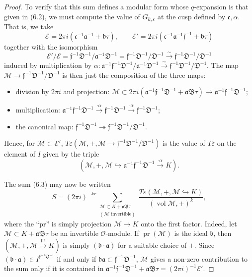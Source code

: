 \documentclass[12pt,a4paper]{article}
\theoremstyle{plain}
\theoremstyle{definition}
\theoremstyle{remark}
\DeclareMathOperator{\vol}{vol}
\DeclareMathOperator{\pr}{pr}
\begin{document}
\begin{proof}
To verify that this sum defines a modular form whose $q$-expansion is that given in (6.2), we must compute the value of $G_{k,\varepsilon}$ at the cusp defined by $\mathfrak{c}, \alpha$. That is, we take
\[
\mathcal{E} = 2\pi i(\mathfrak{c}^{-1}\mathfrak{a}^{-1} + \mathfrak{b}\tau), \qquad \mathcal{E}' = 2\pi i(\mathfrak{c}^{-1}\mathfrak{a}^{-1}\mathfrak{f}^{-1} + \mathfrak{b}\tau)
\]
together with the isomorphism
\[
\mathcal{E}'/\mathcal{E} = \mathfrak{f}^{-1}\mathfrak{D}^{-1}/\mathfrak{a}^{-1} \mathfrak{D}^{-1} = \mathfrak{f}^{-1}\mathfrak{D}^{-1}/\mathfrak{D}^{-1} \xrightarrow{\sim} \mathfrak{f}^{-1}\mathfrak{D}^{-1}/\mathfrak{D}^{-1}
\]
induced by multiplication by $\alpha: \mathfrak{a}^{-1}\mathfrak{f}^{-1}\mathfrak{D}^{-1}/\mathfrak{a}^{-1}\mathfrak{D}^{-1} \xrightarrow{\sim} \mathfrak{f}^{-1}\mathfrak{D}^{-1}/\mathfrak{D}^{-1}$. The map $\mathscr{M} \to \mathfrak{f}^{-1}\mathfrak{D}^{-1}/\mathfrak{D}^{-1}$ is then just the composition of the three maps:
\begin{itemize}
\item division by $2\pi i$ and projection: $\mathscr{M} \subset 2\pi i(\mathfrak{a}^{-1}\mathfrak{f}^{-1}\mathfrak{D}^{-1} + \mathfrak{a}\mathfrak{B}\tau) \to \mathfrak{a}^{-1}\mathfrak{f}^{-1}\mathfrak{D}^{-1}$;
\item multiplication: $\mathfrak{a}^{-1}\mathfrak{f}^{-1}\mathfrak{D}^{-1} \xrightarrow{\cdot \alpha} \mathfrak{f}^{-1}\mathfrak{D}^{-1} \xrightarrow{\cdot \alpha} \mathfrak{f}^{-1}\mathfrak{D}^{-1}$;
\item the canonical map: $\mathfrak{f}^{-1}\mathfrak{D}^{-1} \twoheadrightarrow \mathfrak{f}^{-1}\mathfrak{D}^{-1}/\mathfrak{D}^{-1}$.
\end{itemize}
Hence, for $\mathscr{M} \subset \mathcal{E}'$, $T\varepsilon(\mathscr{M}, +, \mathscr{M} \to \mathfrak{f}^{-1}\mathfrak{D}^{-1}/\mathfrak{D}^{-1})$ is the value of $T\varepsilon$ on the element of $I$ given by the triple
\[
(\mathscr{M}, +, \mathscr{M} \hookrightarrow \mathfrak{a}^{-1}\mathfrak{f}^{-1}\mathfrak{D}^{-1} \xrightarrow{\cdot \alpha} K).
\]

The sum (6.3) may now be written
\[
S = (2\pi i)^{-kr} \sum_{\substack{\mathscr{M} \subset K + \mathfrak{a}\mathfrak{B}\tau \\ (\mathscr{M} \text{ invertible})}} \frac{T\varepsilon(\mathscr{M}, +, \mathscr{M} \hookrightarrow K)}{(\vol \mathscr{M}, +)^k},
\]
where the ``pr'' is simply projection $\mathscr{M} \to K$ onto the first factor. Indeed, let $\mathscr{M} \subset K + \mathfrak{a}\mathfrak{B}\tau$ be an invertible $\mathcal{O}$-module. If $\pr(\mathscr{M})$ is the ideal $\mathfrak{b}$, then $(\mathscr{M}, +, \mathscr{M} \xrightarrow{\pr} K)$ is simply $(\mathfrak{b} \cdot \mathfrak{a})$ for a suitable choice of $+$. Since $(\mathfrak{b} \cdot \mathfrak{a}) \in I^{\mathfrak{f}^{-1}\mathfrak{D}^{-1}}$ if and only if $\mathfrak{b}\mathfrak{a} \subset \mathfrak{f}^{-1}\mathfrak{D}^{-1}$, $\mathscr{M}$ gives a non-zero contribution to the sum only if it is contained in $\mathfrak{a}^{-1}\mathfrak{f}^{-1}\mathfrak{D}^{-1} + \mathfrak{a}\mathfrak{B}\tau = (2\pi i)^{-1}\mathcal{E}'$.


\end{proof}
\end{document}
